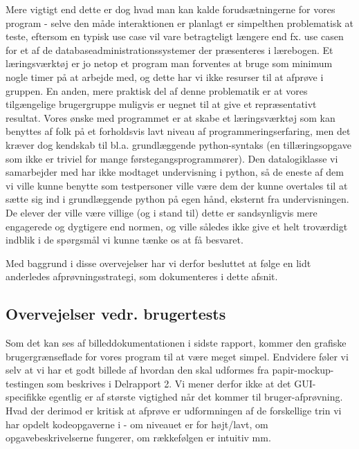 \documentclass[10pt,a4paper,danish]{article}
\begin{document}
Mere vigtigt end dette er dog hvad man kan kalde forudsætningerne for vores program - selve den
måde interaktionen er planlagt er simpelthen problematisk at teste, eftersom en typisk use case
vil vare betragteligt længere end fx. use casen for et af de databaseadministrationssystemer der
præsenteres i lærebogen. Et læringsværktøj er jo netop et program man forventes at bruge som
minimum nogle timer på at arbejde med, og dette har vi ikke resurser til at afprøve i gruppen. 
En anden, mere praktisk del af denne problematik er at vores tilgængelige brugergruppe muligvis er 
uegnet til at give et repræsentativt resultat. Vores ønske med programmet er at skabe et læringsværktøj
som kan benyttes af folk på et forholdsvis lavt niveau af programmeringserfaring, men det kræver
dog kendskab til bl.a. grundlæggende python-syntaks (en tillæringsopgave som ikke er triviel for
mange førstegangsprogrammører). Den datalogiklasse vi samarbejder med har ikke modtaget undervisning
i python, så de eneste af dem vi ville kunne benytte som testpersoner ville være dem der kunne 
overtales til at sætte sig ind i grundlæggende python på egen hånd, eksternt fra undervisningen. 
De elever der ville være villige (og i stand til) dette er sandsynligvis mere engagerede og dygtigere
end normen, og ville således ikke give et helt troværdigt indblik i de spørgsmål vi kunne tænke os
at få besvaret. 

Med baggrund i disse overvejelser har vi derfor besluttet at følge en lidt anderledes afprøvningsstrategi,
som dokumenteres i dette afsnit. 

\subsection{Overvejelser vedr. brugertests}
Som det kan ses af billeddokumentationen i sidste rapport, kommer den grafiske brugergrænseflade
for vores program til at være meget simpel. Endvidere føler vi selv at vi har et godt
billede af hvordan den skal udformes fra papir-mockup-testingen som beskrives i Delrapport 2.
Vi mener derfor ikke at det GUI-specifikke egentlig er af største vigtighed når det kommer til bruger-afprøvning. 
Hvad der derimod er kritisk at afprøve er udformningen af de forskellige trin vi har opdelt 
kodeopgaverne i - om niveauet er for højt/lavt, om opgavebeskrivelserne fungerer, om rækkefølgen
er intuitiv mm. 
\end{document}

